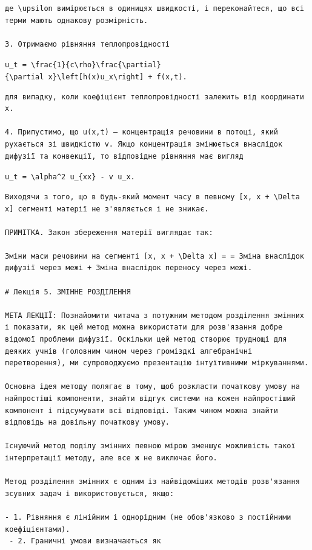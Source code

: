 \documentclass[
  ukrainian,
]{article}
\begin{document}
\begin{verbatim}
де \upsilon вимірюється в одиницях швидкості, і переконайтеся, що всі терми мають однакову розмірність.

3. Отримаємо рівняння теплопровідності
\end{verbatim}

\texttt{u\_t\ =\ \textbackslash{}frac\{1\}\{c\textbackslash{}rho\}\textbackslash{}frac\{\textbackslash{}partial\}\{\textbackslash{}partial\ x\}\textbackslash{}left{[}h(x)u\_x\textbackslash{}right{]}\ +\ f(x,t).}

\begin{verbatim}
для випадку, коли коефіцієнт теплопровідності залежить від координати x.

4. Припустимо, що u(x,t) — концентрація речовини в потоці, який рухається зі швидкістю v. Якщо концентрація змінюється внаслідок дифузії та конвекції, то відповідне рівняння має вигляд
\end{verbatim}

\texttt{u\_t\ =\ \textbackslash{}alpha\^{}2\ u\_\{xx\}\ -\ v\ u\_x.}

\begin{verbatim}
Виходячи з того, що в будь-який момент часу в певному [x, x + \Delta x] сегменті матерії не з'являється і не зникає.

ПРИМІТКА. Закон збереження матерії виглядає так:

Зміни маси речовини на сегменті [x, x + \Delta x] = = Зміна внаслідок дифузії через межі + Зміна внаслідок переносу через межі.

# Лекція 5. ЗМІННЕ РОЗДІЛЕННЯ

МЕТА ЛЕКЦІЇ: Познайомити читача з потужним методом розділення змінних і показати, як цей метод можна використати для розв'язання добре відомої проблеми дифузії. Оскільки цей метод створює труднощі для деяких учнів (головним чином через громіздкі алгебранічні перетворення), ми супроводжуємо презентацію інтуїтивними міркуваннями.

Основна ідея методу полягає в тому, щоб розкласти початкову умову на найпростіші компоненти, знайти відгук системи на кожен найпростіший компонент і підсумувати всі відповіді. Таким чином можна знайти відповідь на довільну початкову умову.

Існуючий метод поділу змінних певною мірою зменшує можливість такої інтерпретації методу, але все ж не виключає його.

Метод розділення змінних є одним із найвідоміших методів розв'язання зсувних задач і використовується, якщо:

- 1. Рівняння є лінійним і однорідним (не обов'язково з постійними коефіцієнтами).
 - 2. Граничні умови визначаються як
\end{verbatim}
\end{document}
